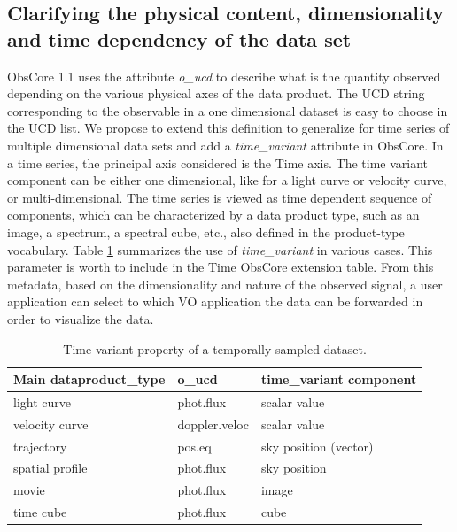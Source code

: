 \documentclass[11pt,a4paper]{ivoa}
\begin{document}
\subsection{Clarifying the physical content, dimensionality and time dependency of the data set}
\label{sec:timevariant}
ObsCore 1.1 uses the attribute \emph{o\_ucd} to describe what is the quantity observed depending on the various physical axes of the data product. The  UCD string corresponding to the observable in  a one dimensional dataset is  easy to choose in the UCD list.  We propose to extend this definition to generalize for time series of multiple dimensional data sets and add a \emph{time\_variant} attribute in ObsCore.
In a time series, the principal axis considered is the Time axis. The time variant component can be either one dimensional, like for a light curve or velocity curve, or multi-dimensional. The time series is viewed as  time dependent sequence of components, which can be characterized  by a data product type, such as an image, a spectrum, a spectral cube, etc., also  defined in the product-type vocabulary. Table \ref{tab:timevar} summarizes the use of \emph{ time\_variant}  in various cases.
This parameter is worth to include in the Time ObsCore extension table. From this metadata, based on the dimensionality and nature of the observed signal, a user application can select to which VO application the data can be forwarded in order to visualize the data.

\begin{table}[!htb]
   \begin{center}
  \caption{Time variant property of a temporally sampled dataset.  \label{tab:timevar} }

  \begin{small}
  \begin{tabular}{|l|l|l|}
\sptablerule
\textbf{Main dataproduct\_type} & \textbf{o\_ucd}  &\textbf{time\_variant component }   \\ \hline
light curve & phot.flux &  scalar value \\ \hline
velocity curve & doppler.veloc & scalar value \\ \hline
trajectory & pos.eq  &  sky position (vector) \\ \hline
spatial profile&  phot.flux & sky position \\ \hline
movie & phot.flux & image \\ \hline
time cube & phot.flux & cube \\ \hline
 \end{tabular}
  \end{small}
  \end{center}
 \end{table}
\end{document}
